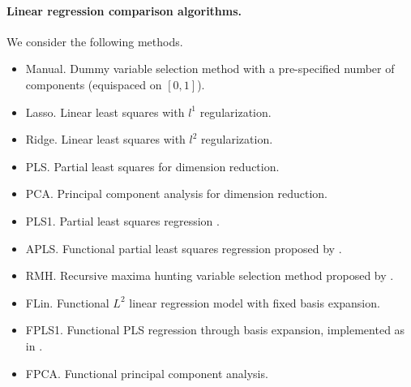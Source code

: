 \paragraph{Linear regression comparison algorithms.} We consider the following methods.
\begin{itemize}
  \item Manual. Dummy variable selection method with a pre-specified number of components (equispaced on \([0, 1]\)).
  \item Lasso. Linear least squares with \(l^1\) regularization.
  \item Ridge. Linear least squares with \(l^2\) regularization.
  \item PLS. Partial least squares for dimension reduction.
  \item PCA. Principal component analysis for dimension reduction.
  \item PLS1. Partial least squares regression \citep[e.g.][]{wegelin2000survey}.
  \item APLS. Functional partial least squares regression proposed by \citet{delaigle2012methodology}.
  \item RMH. Recursive maxima hunting variable selection method proposed by \citet{torrecilla2016feature}.
  \item FLin. Functional \(L^2\) linear regression model with fixed basis expansion.
  \item FPLS1. Functional PLS regression through basis expansion, implemented as in \citet{aguilera2010using}.
  \item FPCA. Functional principal component analysis.
\end{itemize}

